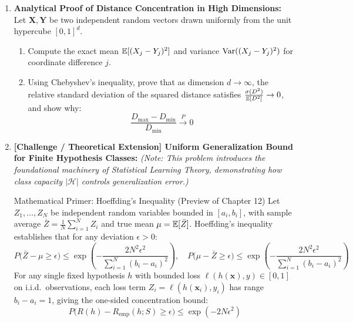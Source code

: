 \begin{enumerate}[label=\textbf{P\arabic*.}]
    \item \textbf{Analytical Proof of Distance Concentration in High Dimensions:}
    Let $\mathbf{X}, \mathbf{Y}$ be two independent random vectors drawn uniformly from the unit hypercube $[0, 1]^d$.
    \begin{enumerate}[label=(\alph*)]
        \item Compute the exact mean $\operatorname{\mathbb{E}}[(X_j - Y_j)^2]$ and variance $\operatorname{Var}((X_j - Y_j)^2)$ for coordinate difference $j$.
        \item Using Chebyshev's inequality, prove that as dimension $d \to \infty$, the relative standard deviation of the squared distance satisfies $\frac{\sigma(D^2)}{\operatorname{\mathbb{E}}[D^2]} \to 0$, and show why:
        \begin{equation*}
        \frac{D_{\max} - D_{\min}}{D_{\min}} \xrightarrow{P} 0
        \end{equation*}
    \end{enumerate}

    \item \textbf{[Challenge / Theoretical Extension] Uniform Generalization Bound for Finite Hypothesis Classes:}
    \textit{(Note: This problem introduces the foundational machinery of Statistical Learning Theory, demonstrating how class capacity $|\mathcal{H}|$ controls generalization error.)}

    \begin{theorembox}{Mathematical Primer: Hoeffding's Inequality (Preview of Chapter 12)}
    Let $Z_1, \dots, Z_N$ be independent random variables bounded in $[a_i, b_i]$, with sample average $\bar{Z} = \frac{1}{N}\sum_{i=1}^N Z_i$ and true mean $\mu = \operatorname{\mathbb{E}}[\bar{Z}]$. Hoeffding's inequality establishes that for any deviation $\epsilon > 0$:
    \begin{equation*}
    P\big(\bar{Z} - \mu \ge \epsilon\big) \le \exp\left(-\frac{2N^2\epsilon^2}{\sum_{i=1}^N (b_i - a_i)^2}\right), \quad P\big(\mu - \bar{Z} \ge \epsilon\big) \le \exp\left(-\frac{2N^2\epsilon^2}{\sum_{i=1}^N (b_i - a_i)^2}\right)
    \end{equation*}
    For any single fixed hypothesis $h$ with bounded loss $\ell(h(\mathbf{x}), y) \in [0, 1]$ on i.i.d.\ observations, each loss term $Z_i = \ell(h(\mathbf{x}_i), y_i)$ has range $b_i - a_i = 1$, giving the one-sided concentration bound:
    \begin{equation*}
    P\big(R(h) - R_{\text{emp}}(h; S) \ge \epsilon\big) \le \exp\left(-2N\epsilon^2\right)
    \end{equation*}
    \end{theorembox}


\end{enumerate}
